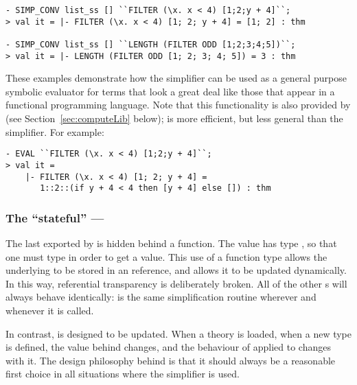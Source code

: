 {\begin{session}
\begin{hol}
\begin{verbatim}
- SIMP_CONV list_ss [] ``FILTER (\x. x < 4) [1;2;y + 4]``;
> val it = |- FILTER (\x. x < 4) [1; 2; y + 4] = [1; 2] : thm

- SIMP_CONV list_ss [] ``LENGTH (FILTER ODD [1;2;3;4;5])``;
> val it = |- LENGTH (FILTER ODD [1; 2; 3; 4; 5]) = 3 : thm
\end{verbatim}
\end{hol}
\end{session}
These examples demonstrate how the simplifier can be used as a general
purpose symbolic evaluator for terms that look a great deal like those
that appear in a functional programming language.  Note that
this functionality is also provided by  (see
Section~\ref{sec:computeLib} below);  is more
efficient, but less general than the simplifier.  For example:
\begin{session}
\begin{hol}
\begin{verbatim}
- EVAL ``FILTER (\x. x < 4) [1;2;y + 4]``;
> val it =
    |- FILTER (\x. x < 4) [1; 2; y + 4] =
       1::2::(if y + 4 < 4 then [y + 4] else []) : thm
\end{verbatim}
\end{hol}
\end{session}

\subsubsection{The ``stateful'' \simpset---}
\label{sec:srw_ss}

The last \simpset{} exported by  is hidden behind a
function.  The  value has type , so
that one must type  in order to get a \simpset{} value.
This use of a function type allows the underlying \simpset{} to be
stored in an \ML{} reference, and allows it to be updated
dynamically.  In this way, referential transparency is deliberately
broken.  All of the other \simpset{}s will always behave identically:
 is the same simplification routine wherever
and whenever it is called.

In contrast,  is designed to be updated.  When a theory is
loaded, when a new type is defined, the value behind 
changes, and the behaviour of  applied to
 changes with it.  The design philosophy behind
 is that it should always be a reasonable first choice in
all situations where the simplifier is used.

}
